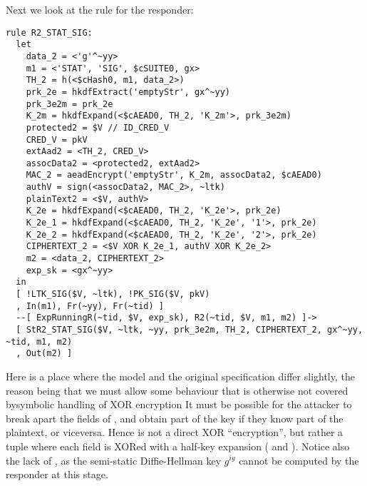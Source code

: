Next we look at the rule for the responder:
\begin{lstlisting}
rule R2_STAT_SIG:
  let
    data_2 = <'g'^~yy>
    m1 = <'STAT', 'SIG', $cSUITE0, gx> 
    TH_2 = h(<$cHash0, m1, data_2>)
    prk_2e = hkdfExtract('emptyStr', gx^~yy)
    prk_3e2m = prk_2e
    K_2m = hkdfExpand(<$cAEAD0, TH_2, 'K_2m'>, prk_3e2m)
    protected2 = $V // ID_CRED_V
    CRED_V = pkV
    extAad2 = <TH_2, CRED_V> 
    assocData2 = <protected2, extAad2>
    MAC_2 = aeadEncrypt('emptyStr', K_2m, assocData2, $cAEAD0)
    authV = sign(<assocData2, MAC_2>, ~ltk)
    plainText2 = <$V, authV>
    K_2e = hkdfExpand(<$cAEAD0, TH_2, 'K_2e'>, prk_2e)
    K_2e_1 = hkdfExpand(<$cAEAD0, TH_2, 'K_2e', '1'>, prk_2e)
    K_2e_2 = hkdfExpand(<$cAEAD0, TH_2, 'K_2e', '2'>, prk_2e)
    CIPHERTEXT_2 = <$V XOR K_2e_1, authV XOR K_2e_2> 
    m2 = <data_2, CIPHERTEXT_2>
    exp_sk = <gx^~yy>
  in
  [ !LTK_SIG($V, ~ltk), !PK_SIG($V, pkV)
  , In(m1), Fr(~yy), Fr(~tid) ]
  --[ ExpRunningR(~tid, $V, exp_sk), R2(~tid, $V, m1, m2) ]->
  [ StR2_STAT_SIG($V, ~ltk, ~yy, prk_3e2m, TH_2, CIPHERTEXT_2, gx^~yy, ~tid, m1, m2) 
  , Out(m2) ]
\end{lstlisting}
Here is a place where the model and the original specification differ
slightly, the reason being that we must allow some behaviour that is
otherwise not covered bysymbolic handling of XOR encryption It must
be possible for the attacker to break apart the fields of
, and obtain part of the key 
if they know part of the plaintext, or viceversa.
%
Hence  is not a direct XOR ``encryption'', but rather a tuple
where each field is XORed with a half-key expansion ( and
).  Notice also the lack of , as the semi-static
Diffie-Hellman key $g^{iy}$ cannot be computed by the responder at this stage.


